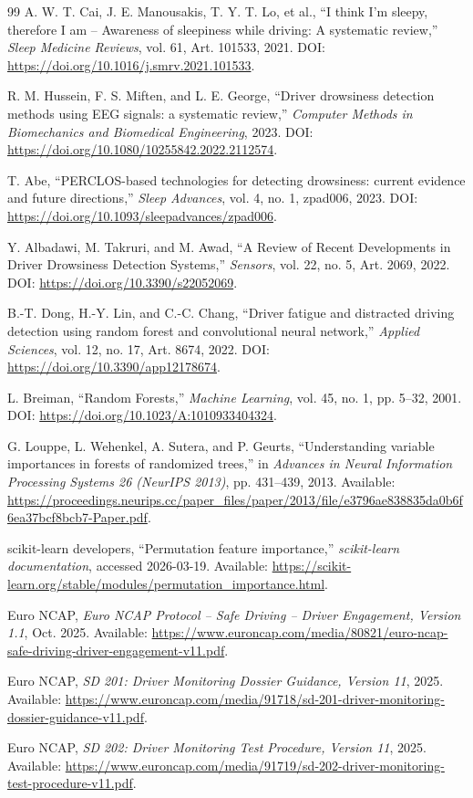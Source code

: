 \documentclass[12pt,a4paper]{article}
\begin{document}
\begin{thebibliography}{99}
A. W. T. Cai, J. E. Manousakis, T. Y. T. Lo, et al.,
``I think I'm sleepy, therefore I am -- Awareness of sleepiness while driving: A systematic review,''
\emph{Sleep Medicine Reviews}, vol. 61, Art. 101533, 2021.
DOI: \url{https://doi.org/10.1016/j.smrv.2021.101533}.

R. M. Hussein, F. S. Miften, and L. E. George,
``Driver drowsiness detection methods using EEG signals: a systematic review,''
\emph{Computer Methods in Biomechanics and Biomedical Engineering}, 2023.
DOI: \url{https://doi.org/10.1080/10255842.2022.2112574}.

T. Abe,
``PERCLOS-based technologies for detecting drowsiness: current evidence and future directions,''
\emph{Sleep Advances}, vol. 4, no. 1, zpad006, 2023.
DOI: \url{https://doi.org/10.1093/sleepadvances/zpad006}.

Y. Albadawi, M. Takruri, and M. Awad,
``A Review of Recent Developments in Driver Drowsiness Detection Systems,''
\emph{Sensors}, vol. 22, no. 5, Art. 2069, 2022.
DOI: \url{https://doi.org/10.3390/s22052069}.

B.-T. Dong, H.-Y. Lin, and C.-C. Chang,
``Driver fatigue and distracted driving detection using random forest and convolutional neural network,''
\emph{Applied Sciences}, vol. 12, no. 17, Art. 8674, 2022.
DOI: \url{https://doi.org/10.3390/app12178674}.

L. Breiman,
``Random Forests,''
\emph{Machine Learning}, vol. 45, no. 1, pp. 5--32, 2001.
DOI: \url{https://doi.org/10.1023/A:1010933404324}.

G. Louppe, L. Wehenkel, A. Sutera, and P. Geurts,
``Understanding variable importances in forests of randomized trees,''
in \emph{Advances in Neural Information Processing Systems 26 (NeurIPS 2013)}, pp. 431--439, 2013.
Available: \url{https://proceedings.neurips.cc/paper_files/paper/2013/file/e3796ae838835da0b6f6ea37bcf8bcb7-Paper.pdf}.

scikit-learn developers,
``Permutation feature importance,''
\emph{scikit-learn documentation}, accessed 2026-03-19.
Available: \url{https://scikit-learn.org/stable/modules/permutation_importance.html}.

Euro NCAP,
\emph{Euro NCAP Protocol -- Safe Driving -- Driver Engagement, Version 1.1}, Oct. 2025.
Available: \url{https://www.euroncap.com/media/80821/euro-ncap-safe-driving-driver-engagement-v11.pdf}.

Euro NCAP,
\emph{SD 201: Driver Monitoring Dossier Guidance, Version 11}, 2025.
Available: \url{https://www.euroncap.com/media/91718/sd-201-driver-monitoring-dossier-guidance-v11.pdf}.

Euro NCAP,
\emph{SD 202: Driver Monitoring Test Procedure, Version 11}, 2025.
Available: \url{https://www.euroncap.com/media/91719/sd-202-driver-monitoring-test-procedure-v11.pdf}.
\end{thebibliography}
\end{document}
